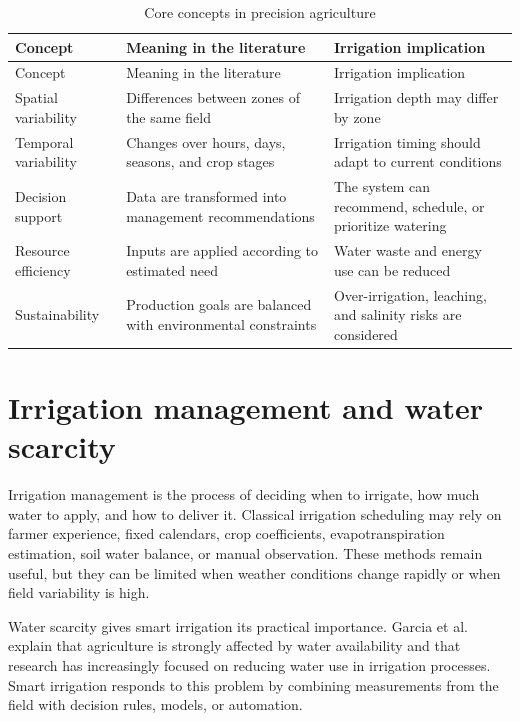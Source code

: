 \begin{footnotesize}
\setlength{\tabcolsep}{2pt}
\begin{longtable}{@{}>{\raggedright\arraybackslash}p{}>{\raggedright\arraybackslash}p{}>{\raggedright\arraybackslash}p{}@{}}
\caption{Core concepts in precision agriculture}\\
\toprule
Concept & Meaning in the literature & Irrigation implication \\
\midrule
\endfirsthead
\toprule
Concept & Meaning in the literature & Irrigation implication \\
\midrule
\endhead
Spatial variability & Differences between zones of the same field & Irrigation depth may differ by zone \\
Temporal variability & Changes over hours, days, seasons, and crop stages & Irrigation timing should adapt to current conditions \\
Decision support & Data are transformed into management recommendations & The system can recommend, schedule, or prioritize watering \\
Resource efficiency & Inputs are applied according to estimated need & Water waste and energy use can be reduced \\
Sustainability & Production goals are balanced with environmental constraints & Over-irrigation, leaching, and salinity risks are considered \\
\bottomrule
\end{longtable}
\end{footnotesize}

\section{Irrigation management and water scarcity}

Irrigation management is the process of deciding when to irrigate, how much water to apply, and how to deliver it. Classical irrigation scheduling may rely on farmer experience, fixed calendars, crop coefficients, evapotranspiration estimation, soil water balance, or manual observation. These methods remain useful, but they can be limited when weather conditions change rapidly or when field variability is high.

Water scarcity gives smart irrigation its practical importance. Garcia et al. \cite{garcia2020iotirrigation} explain that agriculture is strongly affected by water availability and that research has increasingly focused on reducing water use in irrigation processes. Smart irrigation responds to this problem by combining measurements from the field with decision rules, models, or automation.

